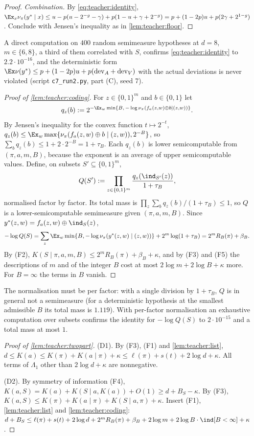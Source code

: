 \begin{proof}
\emph{Combination.} By \eqref{eq:teacher:identity}, $\Ex_x\nu_\pi(y^*\mid x)\le u-p(u-2^{-g}-\gamma)+p(1-u+\gamma+2^{-g})=p+(1-2p)u+p(2\gamma+2^{1-g})$. Conclude with Jensen's inequality as in \cref{lem:teacher:floor}.
\end{proof}

A direct computation on $400$ random semimeasure hypotheses at $d=8$, $m\in\{6,8\}$, a third of them correlated with $S$, confirms \eqref{eq:teacher:identity} to $2.2\cdot10^{-16}$, and the deterministic form $\Ex\nu(y^*)\le p+(1-2p)u+p(\mathrm{dev}_A+\mathrm{dev}_V)$ with the actual deviations is never violated (script \texttt{c7\_\allowbreak{}run2.py}, part (C), seed 7).

\begin{proof}[Proof of \cref{lem:teacher:coding}]
For $z\in\{0,1\}^m$ and $b\in\{0,1\}$ let
\[
q_z(b):=2^{-\Ex_w\min\{B,\,-\log\nu_\pi(f_a(z,w)\oplus b\mid(z,w))\}}.
\]
By Jensen's inequality for the convex function $t\mapsto2^{-t}$, $q_z(b)\le\Ex_w\max\{\nu_\pi(f_a(z,w)\oplus b\mid(z,w)),2^{-B}\}$, so $\sum_bq_z(b)\le1+2\cdot2^{-B}=1+\tau_B$. Each $q_z(b)$ is lower semicomputable from $(\pi,a,m,B)$, because the exponent is an average of upper semicomputable values. Define, on subsets $S'\subseteq\{0,1\}^m$,
\[
Q(S'):=\prod_{z\in\{0,1\}^m}\frac{q_z(\ind_{S'}(z))}{1+\tau_B},
\]
normalised factor by factor. Its total mass is $\prod_z\sum_bq_z(b)/(1+\tau_B)\le1$, so $Q$ is a lower-semicomputable semimeasure given $(\pi,a,m,B)$. Since $y^*(z,w)=f_a(z,w)\oplus\ind_S(z)$,
\[
-\log Q(S)=\sum_z\Ex_w\min\{B,-\log\nu_\pi(y^*(z,w)\mid(z,w))\}+2^m\log(1+\tau_B)=2^mR_B(\pi)+\beta_B.
\]
By (F2), $K(S\mid\pi,a,m,B)\le2^mR_B(\pi)+\beta_B+\kappa$, and by (F3) and (F5) the descriptions of $m$ and of the integer $B$ cost at most $2\log m+2\log B+\kappa$ more. For $B=\infty$ the terms in $B$ vanish.
\end{proof}

The normalisation must be per factor: with a single division by $1+\tau_B$, $Q$ is in general not a semimeasure (for a deterministic hypothesis at the smallest admissible $B$ its total mass is $1.119$). With per-factor normalisation an exhaustive computation over subsets confirms the identity for $-\log Q(S)$ to $2\cdot10^{-15}$ and a total mass at most $1$.

\begin{proof}[Proof of \cref{lem:teacher:twopart}]
(D1). By (F3), (F1) and \cref{lem:teacher:list}, $d\le K(a)\le K(\pi)+K(a\mid\pi)+\kappa\le\ell(\pi)+s(t)+2\log d+\kappa$. All terms of $\Lambda_1$ other than $2\log d+\kappa$ are nonnegative.

(D2). By symmetry of information (F4), $K(a,S)=K(a)+K(S\mid a,K(a))+O(1)\ge d+B_S-\kappa$. By (F3), $K(a,S)\le K(\pi)+K(a\mid\pi)+K(S\mid a,\pi)+\kappa$. Insert (F1), \cref{lem:teacher:list} and \cref{lem:teacher:coding}: $d+B_S\le\ell(\pi)+s(t)+2\log d+2^mR_B(\pi)+\beta_B+2\log m+2\log B\cdot\ind[B<\infty]+\kappa$.
\end{proof}

